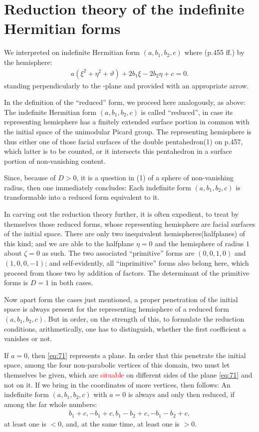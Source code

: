 \section{Reduction theory of the indefinite Hermitian forms}

We interpreted on indefinite Hermitian form $(a,b_1,b_2,c)$ where (p.455 ff.) by the hemisphere:
\begin{align}\label{eq:71}
    a(\xi^2+\eta^2+\vartheta)+2b_1\xi-2b_2\eta+c=0.
\end{align}
standing perpendicularly to the \zeta-plane and provided with an appropriate arrow.

In the definition of the “reduced” form, we proceed here analogously, as above: The indefinite Hermitian form $(a,b_1,b_2,c)$ is called “reduced”, in case its representing hemisphere has a finitely extended surface portion in common with the initial space of the unimodular Picard group. The representing hemisphere is thus either one of those facial surfaces of the double pentahedron(1) on p.457, which latter is to be counted, or it intersects this pentahedron in a surface portion of non-vanishing content.

Since, because of $D>0$, it is a question in (1) of a sphere of non-vanishing radius, then one immediately concludes: Each indefinite form $(a,b_1,b_2,c)$ is transformable into a reduced form equivalent to it.

In carving out the reduction theory further, it is often expedient, to treat  by themselves those reduced forms, whose representing hemisphere are facial surfaces of the initial space. There are only two inequivalent hemispheres(halfplanes) of this kind; and we are able to the halfplane $\eta=0$ and the hemisphere of radius $\mathrm{1}$ about $\zeta=0$ as such. The two associated “primitive” forms are $(0,0,1,0)$ and $(1,0,0,-1)$; and self-evidently, all “inprimitive” forms also belong here, which proceed from those two by addition of factors. The determinant of the primitive forms is $D=1$ in both cases.

Now apart form the cases just mentioned, a proper penetration of the initial space is always present for the representing hemisphere of a reduced form $(a,b_1,b_2,c)$. But in order, on the strength of this, to formulate the reduction conditions, arithmetically, one has to distinguish, whether the first coefficient a vanishes or not.

If $a=0$, then \ref{eq:71} represents a plane. In order that this penetrate the initial space, among the four non-parabolic vertices of this domain, two must let themselves be given, which are \textcolor{red}{situable} on different sides of the plane \ref{eq:71} and not on it. If we bring in the coordinates of more vertices, then follows: An indefinite form $(a,b_1,b_2,c)$ with $a=0$ is always and only then reduced, if among the far whole numbers:
\begin{align}\label{eq:72}
    b_1+c, -b_1+c, b_1-b_2+c, -b_1-b_2+c,
\end{align}
at least one is $<0$, and, at the same time, at least one is $>0$.


